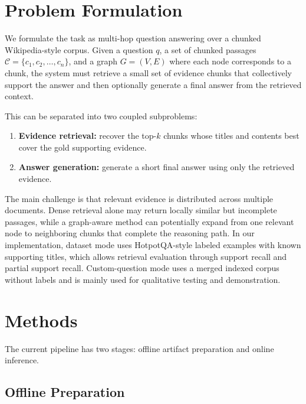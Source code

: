 \documentclass[10pt]{article}
\begin{document}
\section{Problem Formulation}

We formulate the task as multi-hop question answering over a chunked Wikipedia-style corpus. Given a question $q$, a set of chunked passages $\mathcal{C} = \{c_1, c_2, \dots, c_n\}$, and a graph $G=(V,E)$ where each node corresponds to a chunk, the system must retrieve a small set of evidence chunks that collectively support the answer and then optionally generate a final answer from the retrieved context.

This can be separated into two coupled subproblems:
\begin{enumerate}
    \item \textbf{Evidence retrieval:} recover the top-$k$ chunks whose titles and contents best cover the gold supporting evidence.
    \item \textbf{Answer generation:} generate a short final answer using only the retrieved evidence.
\end{enumerate}

The main challenge is that relevant evidence is distributed across multiple documents. Dense retrieval alone may return locally similar but incomplete passages, while a graph-aware method can potentially expand from one relevant node to neighboring chunks that complete the reasoning path. In our implementation, dataset mode uses HotpotQA-style labeled examples with known supporting titles, which allows retrieval evaluation through support recall and partial support recall. Custom-question mode uses a merged indexed corpus without labels and is mainly used for qualitative testing and demonstration.

\section{Methods}

The current pipeline has two stages: offline artifact preparation and online inference.

\subsection{Offline Preparation}
\end{document}
